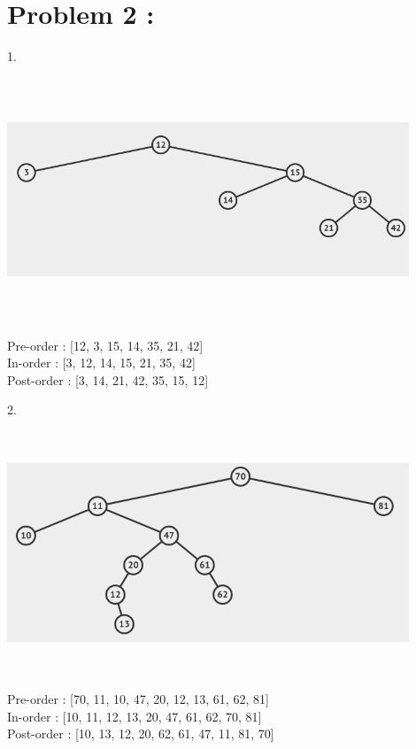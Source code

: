 \documentclass{report}
\begin{document}
    \section* {Problem 2 :}
    1.\\
    \includegraphics[height = 80mm,width = 120mm]{3_1.png}\\
    Pre-order : [12, 3, 15, 14, 35, 21, 42]\\
    In-order : [3, 12, 14, 15, 21, 35, 42]\\
    Post-order : [3, 14, 21, 42, 35, 15, 12]
    \newpage

    2.\\

    \includegraphics[height = 80mm,width = 120mm]{3_2.png}\\
    Pre-order : [70, 11, 10, 47, 20, 12, 13, 61, 62, 81]\\
    In-order : [10, 11, 12, 13, 20, 47, 61, 62, 70, 81]\\
    Post-order : [10, 13, 12, 20, 62, 61, 47, 11, 81, 70]\\
\end{document}
